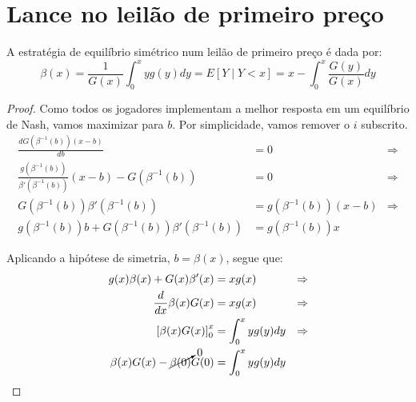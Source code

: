 \section{Lance no leilão de primeiro preço}
\begin{lema}
	A estratégia de equilíbrio simétrico num leilão de primeiro preço é dada por:
	\begin{equation}
		\beta(x) = \frac{1}{G(x)} \int_{0}^{x} yg(y)dy = E\left[ Y \mid Y<x \right] = x - \int_{0}^{x} \frac{G(y)}{G(x)}dy
	\end{equation}
\end{lema}
\begin{proof}
	Como todos os jogadores implementam a melhor resposta em um equilíbrio de Nash, vamos maximizar para $b$. Por simplicidade, vamos remover o $i$ subscrito.
	\begin{align*}
		\frac{d G(\beta^{-1}(b)) (x - b)}{db} & = 0 & \Rightarrow \\
		\frac{ g( \beta^{-1}(b) ) }{ \beta'( \beta^{-1}(b) ) }(x - b) - G( \beta^{-1}(b) ) & = 0 & \Rightarrow \\
		G( \beta^{-1}(b) )\beta'( {\beta^{-1}(b)} ) & = g( \beta^{-1}(b) )(x - b) & \Rightarrow \\
		g(\beta^{-1}(b))b + G(\beta^{-1}(b))\beta'({\beta^{-1}(b)}) & = g(\beta^{-1}(b))x
	\end{align*}
	
	Aplicando a hipótese de simetria, $b = \beta(x)$, segue que:
	\begin{align*}
		g(x)\beta(x) + G(x)\beta'(x) & = xg(x) & \Rightarrow \\
		\frac{d}{dx} \beta(x)G(x) & = xg(x) & \Rightarrow \\
		\left[ \beta(x)G(x) \right]_{0}^{x} & = \int_{0}^{x} yg(y)dy & \Rightarrow \\
		\beta(x)G(x) - \cancelto{0}{\beta(0)}G(0) & = \int_{0}^{x} yg(y)dy
	\end{align*}
\end{proof}